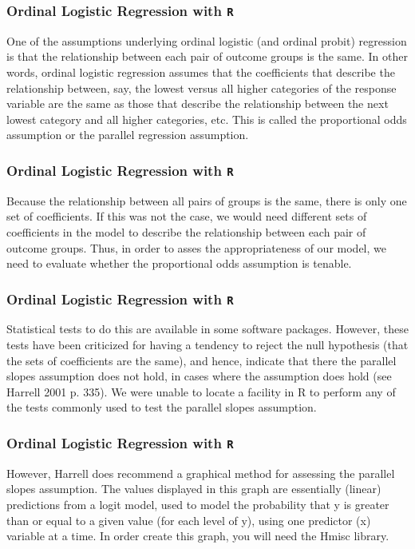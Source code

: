 \documentclass[00-GLMregslides.tex]{subfiles}
\begin{document}
	
	\begin{frame}[fragile]
		
		\frametitle{Ordinal Logistic Regression with \texttt{R}}
		\Large
		
		One of the assumptions underlying ordinal logistic (and ordinal probit) regression is that the relationship between each pair of outcome groups is the same. In other words, ordinal logistic regression assumes that the coefficients that describe the relationship between, say, the lowest versus all higher categories of the response variable are the same as those that describe the relationship between the next lowest category and all higher categories, etc. This is called the proportional odds assumption or the parallel regression assumption. 
		
	\end{frame}
	\begin{frame}[fragile]
		
		\frametitle{Ordinal Logistic Regression with \texttt{R}}
		\Large
		
		Because the relationship between all pairs of groups is the same, there is only one set of coefficients. If this was not the case, we would need different sets of coefficients in the model to describe the relationship between each pair of outcome groups. Thus, in order to asses the appropriateness of our model, we need to evaluate whether the proportional odds assumption is tenable.
		
	\end{frame}
	\begin{frame}[fragile]
		
		\frametitle{Ordinal Logistic Regression with \texttt{R}}
		\Large
		Statistical tests to do this are available in some software packages. However, these tests have been criticized for having a tendency to reject the null hypothesis (that the sets of coefficients are the same), and hence, indicate that there the parallel slopes assumption does not hold, in cases where the assumption does hold (see Harrell 2001 p. 335). We were unable to locate a facility in R to perform any of the tests commonly used to test the parallel slopes assumption.
		
	\end{frame}
	\begin{frame}[fragile]
		
		\frametitle{Ordinal Logistic Regression with \texttt{R}}
		\Large
		
		However, Harrell does recommend a graphical method for assessing the parallel slopes assumption. The values displayed in this graph are essentially (linear) predictions from a logit model, used to model the probability that y is greater than or equal to a given value (for each level of y), using one predictor (x) variable at a time. In order create this graph, you will need the Hmisc library.
	\end{frame}
\end{document}
